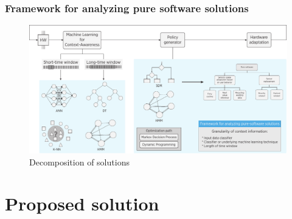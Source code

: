 \documentclass[compress,9pt,xcolor={dvipsnames,table}]{beamer}
\begin{document}


\begin{frame}[t]\frametitle{Framework for analyzing pure software solutions}
\begin{figure}[tb]
  \centering
  \includegraphics[width=\textwidth]{../../../resources/images/vectors/dual-taxonomy}
  \caption{Decomposition of solutions}
  \label{fig:dual-taxonomy}
  \end{figure}
\end{frame}


\section{Proposed solution}
\end{document}
